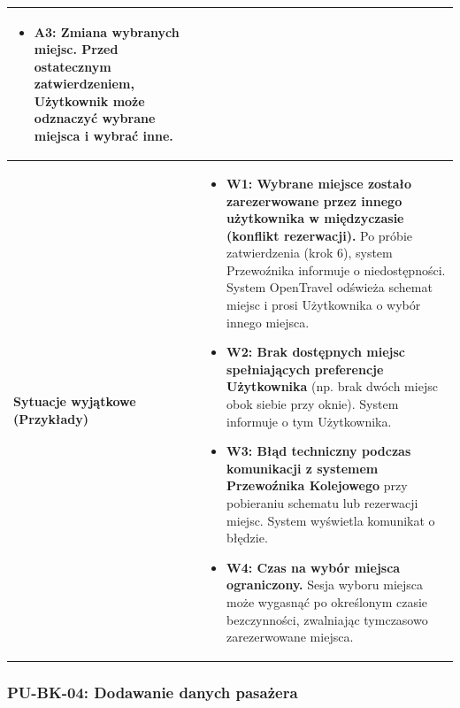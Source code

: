 \documentclass[a4paper,12pt]{article}
\begin{document}
\begin{longtable}{|p{\pierwszakolumnaszerokoscPUBKWybormiejsca}|p{\drugakolumnaszerokoscPUBKWybormiejsca}|}
\begin{itemize}
            \item \textbf{A3: Zmiana wybranych miejsc.} Przed ostatecznym zatwierdzeniem, Użytkownik może odznaczyć wybrane miejsca i wybrać inne.
        \end{itemize} \\
    \hline
    \textbf{Sytuacje wyjątkowe (Przykłady)} &
        \begin{itemize} \itemsep0pt \parskip0pt \parsep0pt
            \item \textbf{W1: Wybrane miejsce zostało zarezerwowane przez innego użytkownika w międzyczasie (konflikt rezerwacji).} Po próbie zatwierdzenia (krok 6), system Przewoźnika informuje o niedostępności. System OpenTravel odświeża schemat miejsc i prosi Użytkownika o wybór innego miejsca.
            \item \textbf{W2: Brak dostępnych miejsc spełniających preferencje Użytkownika} (np. brak dwóch miejsc obok siebie przy oknie). System informuje o tym Użytkownika.
            \item \textbf{W3: Błąd techniczny podczas komunikacji z systemem Przewoźnika Kolejowego} przy pobieraniu schematu lub rezerwacji miejsc. System wyświetla komunikat o błędzie.
            \item \textbf{W4: Czas na wybór miejsca ograniczony.} Sesja wyboru miejsca może wygasnąć po określonym czasie bezczynności, zwalniając tymczasowo zarezerwowane miejsca.
        \end{itemize} \\
\end{longtable}
\endgroup

\subsubsection{PU-BK-04: Dodawanie danych pasażera}

\begingroup %
\small %
\renewcommand{\arraystretch}{1.2} %

\newlength{\pierwszakolumnaszerokoscPUBKDanePas}
\setlength{\pierwszakolumnaszerokoscPUBKDanePas}{4.0cm}

\newlength{\drugakolumnaszerokoscPUBKDanePas}
\setlength{\drugakolumnaszerokoscPUBKDanePas}{\dimexpr\textwidth-\pierwszakolumnaszerokoscPUBKDanePas-2\tabcolsep-3\arrayrulewidth\relax}
\end{document}
